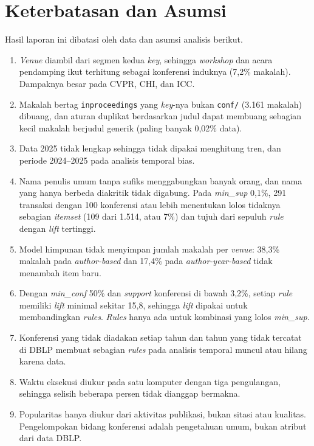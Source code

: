 \section{Keterbatasan dan Asumsi}
Hasil laporan ini dibatasi oleh data dan asumsi analisis berikut.
\begin{enumerate}
\item \textit{Venue} diambil dari segmen kedua \textit{key}, sehingga \textit{workshop} dan acara pendamping ikut terhitung sebagai konferensi induknya (7,2\% makalah). Dampaknya besar pada CVPR, CHI, dan ICC.
\item Makalah bertag \texttt{inproceedings} yang \textit{key}-nya bukan \texttt{conf/} (3.161 makalah) dibuang, dan aturan duplikat berdasarkan judul dapat membuang sebagian kecil makalah berjudul generik (paling banyak 0,02\% data).
\item Data 2025 tidak lengkap sehingga tidak dipakai menghitung tren, dan periode 2024--2025 pada analisis temporal bias.
\item Nama penulis umum tanpa sufiks menggabungkan banyak orang, dan nama yang hanya berbeda diakritik tidak digabung. Pada \textit{min\_sup} 0,1\%, 291 transaksi dengan 100 konferensi atau lebih menentukan lolos tidaknya sebagian \textit{itemset} (109 dari 1.514, atau 7\%) dan tujuh dari sepuluh \textit{rule} dengan \textit{lift} tertinggi.
\item Model himpunan tidak menyimpan jumlah makalah per \textit{venue}: 38,3\% makalah pada \textit{author-based} dan 17,4\% pada \textit{author-year-based} tidak menambah item baru.
\item Dengan \textit{min\_conf} 50\% dan \textit{support} konferensi di bawah 3,2\%, setiap \textit{rule} memiliki \textit{lift} minimal sekitar 15,8, sehingga \textit{lift} dipakai untuk membandingkan \textit{rules}. \textit{Rules} hanya ada untuk kombinasi yang lolos \textit{min\_sup}.
\item Konferensi yang tidak diadakan setiap tahun dan tahun yang tidak tercatat di DBLP membuat sebagian \textit{rules} pada analisis temporal muncul atau hilang karena data.
\item Waktu eksekusi diukur pada satu komputer dengan tiga pengulangan, sehingga selisih beberapa persen tidak dianggap bermakna.
\item Popularitas hanya diukur dari aktivitas publikasi, bukan sitasi atau kualitas. Pengelompokan bidang konferensi adalah pengetahuan umum, bukan atribut dari data DBLP.
\end{enumerate}
